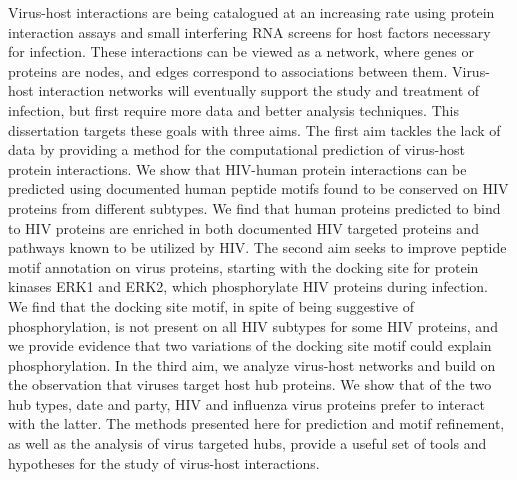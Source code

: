 Virus-host interactions are being catalogued at an increasing rate
using protein interaction assays and small interfering RNA screens for
host factors necessary for infection. These interactions can be viewed
as a network, where genes or proteins are nodes, and edges correspond
to associations between them. Virus-host interaction networks will
eventually support the study and treatment of infection, but first
require more data and better analysis techniques. This dissertation
targets these goals with three aims. The first aim tackles the lack of
data by providing a method for the computational prediction of
virus-host protein interactions. We show that HIV-human protein
interactions can be predicted using documented human peptide motifs
found to be conserved on HIV proteins from different subtypes. We find
that human proteins predicted to bind to HIV proteins are enriched in
both documented HIV targeted proteins and pathways known to be
utilized by HIV. The second aim seeks to improve peptide motif
annotation on virus proteins, starting with the docking site for
protein kinases ERK1 and ERK2, which phosphorylate HIV proteins during
infection. We find that the docking site motif, in spite of being
suggestive of phosphorylation, is not present on all HIV subtypes for
some HIV proteins, and we provide evidence that two variations of the
docking site motif could explain phosphorylation. In the third aim, we
analyze virus-host networks and build on the observation that viruses
target host hub proteins. We show that of the two hub types, date and
party, HIV and influenza virus proteins prefer to interact with the
latter. The methods presented here for prediction and motif
refinement, as well as the analysis of virus targeted hubs, provide a
useful set of tools and hypotheses for the study of virus-host
interactions.

